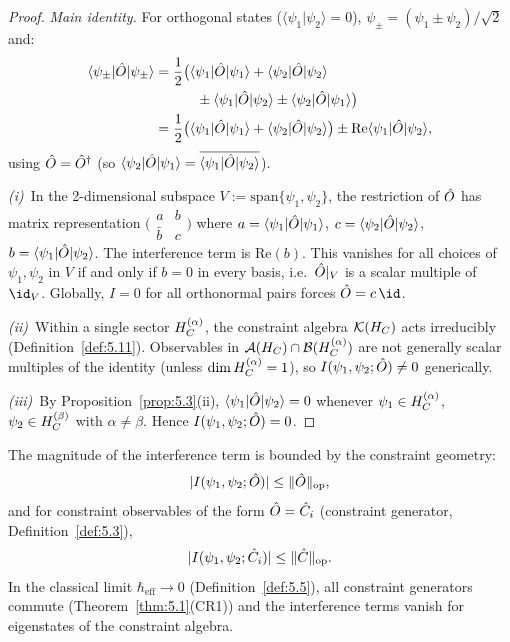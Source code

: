 \begin{proof}
\textit{Main identity.}
For orthogonal states ($\langle\psi_1|\psi_2\rangle = 0$),
$\psi_\pm = (\psi_1 \pm \psi_2)/\sqrt{2}$ and:
\begin{align*}
  \langle\psi_\pm|\hat{O}|\psi_\pm\rangle
  &= \frac{1}{2}\bigl(
    \langle\psi_1|\hat{O}|\psi_1\rangle
    + \langle\psi_2|\hat{O}|\psi_2\rangle \\
  &\qquad\quad
    \pm \langle\psi_1|\hat{O}|\psi_2\rangle
    \pm \langle\psi_2|\hat{O}|\psi_1\rangle
  \bigr) \\
  &= \frac{1}{2}\bigl(
    \langle\psi_1|\hat{O}|\psi_1\rangle
    + \langle\psi_2|\hat{O}|\psi_2\rangle
  \bigr)
  \pm \mathrm{Re}\langle\psi_1|\hat{O}|\psi_2\rangle,
\end{align*}
using $\hat{O} = \hat{O}^\dagger$ (so $\langle\psi_2|\hat{O}|\psi_1\rangle
= \overline{\langle\psi_1|\hat{O}|\psi_2\rangle}$).

\textit{(i)}~In the 2-dimensional subspace
$V := \mathrm{span}\{\psi_1, \psi_2\}$, the restriction of $\hat{O}$ has
matrix representation
$\bigl(\begin{smallmatrix} a & b \\ \bar{b} & c \end{smallmatrix}\bigr)$
where $a = \langle\psi_1|\hat{O}|\psi_1\rangle$,
$c = \langle\psi_2|\hat{O}|\psi_2\rangle$,
$b = \langle\psi_1|\hat{O}|\psi_2\rangle$.  The interference term is
$\mathrm{Re}(b)$.  This vanishes for all choices of $\psi_1, \psi_2$
in $V$ if and only if $b = 0$ in every basis, i.e.\ $\hat{O}|_V$ is a
scalar multiple of $\id_V$.  Globally, $I = 0$ for all orthonormal
pairs forces $\hatO = c\,\id$.

\textit{(ii)}~Within a single sector $H_C^{(\alpha)}$, the constraint
algebra $\mathcal{K}(H_C)$ acts irreducibly
(Definition~\ref{def:5.11}).  Observables in
$\mathcal{A}(H_C) \cap \mathcal{B}(H_C^{(\alpha)})$ are not generally scalar
multiples of the identity (unless $\dim H_C^{(\alpha)} = 1$), so
$I(\psi_1, \psi_2; \hat{O}) \neq 0$ generically.

\textit{(iii)}~By Proposition~\ref{prop:5.3}(ii),
$\langle\psi_1|\hat{O}|\psi_2\rangle = 0$ whenever
$\psi_1 \in H_C^{(\alpha)}$, $\psi_2 \in H_C^{(\beta)}$ with
$\alpha \neq \beta$.  Hence $I(\psi_1, \psi_2; \hat{O}) = 0$.
\end{proof}

\begin{proposition}
\label{prop:8.2}
The magnitude of the interference term is bounded by the constraint
geometry:
\[
  |I(\psi_1, \psi_2; \hat{O})|
  \leq \|\hat{O}\|_{\mathrm{op}},
\]
and for constraint observables of the form
$\hat{O} = \hat{C}_i$ \textup{(}constraint generator,
Definition~\textup{\ref{def:5.3})},
\[
  |I(\psi_1, \psi_2; \hat{C}_i)|
  \leq \|\hat{C}\|_{\mathrm{op}}.
\]
In the classical limit $\hbar_{\mathrm{eff}} \to 0$
\textup{(}Definition~\textup{\ref{def:5.5})}, all constraint generators
commute \textup{(}Theorem~\textup{\ref{thm:5.1}(CR1))} and the
interference terms vanish for eigenstates of the constraint algebra.
\end{proposition}

